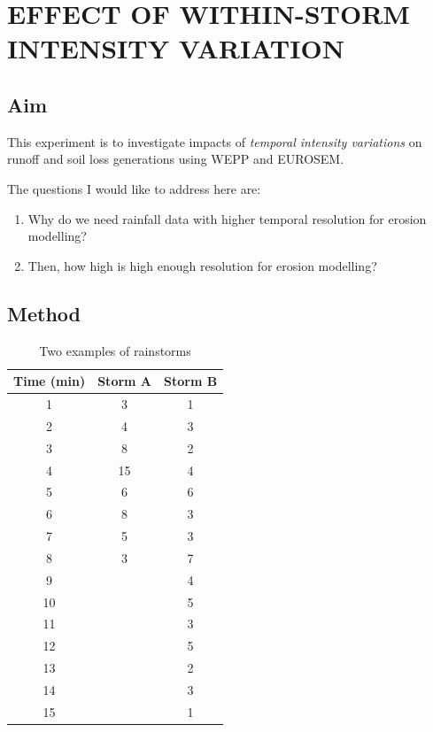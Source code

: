 \chapter{EFFECT OF WITHIN-STORM INTENSITY VARIATION}
\label{chap:bp2bpvariationchapter}

\section{Aim}
\label{sec:Aim}
This experiment is to investigate impacts of \emph{temporal intensity
variations} on runoff and soil loss generations using WEPP and EUROSEM.

The questions I would like to address here are:
\begin{enumerate}
  \item Why do we need rainfall data with higher temporal resolution for erosion
modelling?
  \item Then, how high is high enough resolution for erosion modelling?
\end{enumerate}

\section{Method}
\label{sec:Method}

\begin{table}[htbp]
  \centering
  \small
  \caption{Two examples of rainstorms}
  \label{tab:TwoExamplesofRainstorm}
    \begin{tabular}{ccc}
    \toprule
     Time (min) & Storm A & Storm B \\
    \midrule
    1 & 3 & 1 \\
    2 & 4 & 3 \\
    3 & 8 & 2 \\
    4 & 15 & 4 \\
    5 & 6 & 6 \\
    6 & 8 & 3 \\
    7 & 5 & 3 \\
    8 & 3 & 7 \\
    9 &  & 4 \\
    10&  & 5 \\
    11&  & 3 \\
    12&  & 5 \\
    13&  & 2 \\
    14&  & 3 \\
    15&  & 1 \\
    \bottomrule
    \end{tabular}
\end{table}

